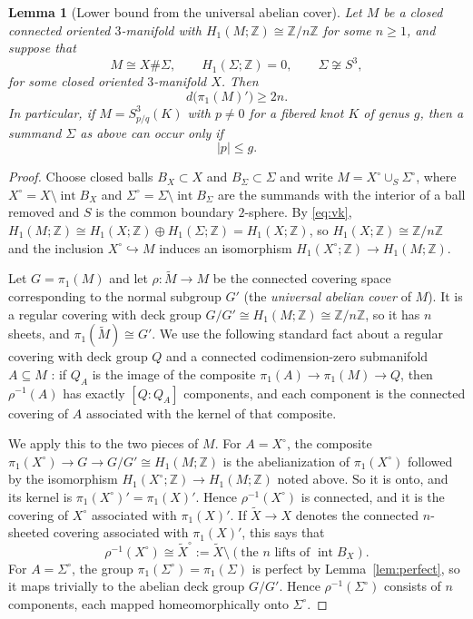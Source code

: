 \documentclass[12pt]{article}
\newcommand{\Z}{\mathbb Z}
\newcommand{\Surg}[2]{S^3_{#1}(#2)}
\newcommand{\Int}{\operatorname{int}}
\newcommand{\rk}{d}
\newtheorem{lemma}[theorem]{Lemma}
\theoremstyle{definition}
\theoremstyle{remark}
\begin{document}
\begin{lemma}[Lower bound from the universal abelian cover]\label{lem:cover}
Let \(M\) be a closed connected oriented \(3\)-manifold with
\(H_1(M;\Z)\cong\Z/n\Z\) for some \(n\geq1\), and suppose that
\[
 M\cong X\#\Sigma,
 \qquad H_1(\Sigma;\Z)=0,\qquad \Sigma\not\cong S^3,
\]
for some closed oriented \(3\)-manifold \(X\). Then
\[
 \rk\bigl(\pi_1(M)'\bigr)\geq 2n.
\]
In particular, if \(M=\Surg{p/q}{K}\) with \(p\neq0\) for a fibered knot
\(K\) of genus \(g\), then a summand \(\Sigma\) as above can occur only if
\begin{equation}\label{eq:numerator}
 |p|\leq g.
\end{equation}
\end{lemma}

\begin{proof}
Choose closed balls \(B_X\subset X\) and \(B_\Sigma\subset\Sigma\) and
write \(M=X^\circ\cup_S\Sigma^\circ\), where
\(X^\circ=X\setminus\Int B_X\) and \(\Sigma^\circ=\Sigma\setminus\Int B_\Sigma\)
are the summands with the interior of a ball removed and \(S\) is the
common boundary \(2\)-sphere. By \eqref{eq:vk},
\(H_1(M;\Z)\cong H_1(X;\Z)\oplus H_1(\Sigma;\Z)=H_1(X;\Z)\), so
\(H_1(X;\Z)\cong\Z/n\Z\) and the inclusion \(X^\circ\hookrightarrow M\)
induces an isomorphism \(H_1(X^\circ;\Z)\to H_1(M;\Z)\).

Let \(G=\pi_1(M)\) and let \(\rho\colon\widetilde M\to M\) be the
connected covering space corresponding to the normal subgroup \(G'\)
(the \emph{universal abelian cover} of \(M\)). It is a regular covering
with deck group \(G/G'\cong H_1(M;\Z)\cong\Z/n\Z\),
so it has \(n\) sheets, and \(\pi_1(\widetilde M)\cong G'\). We use the
following standard fact about a regular covering with deck group \(Q\)
and a connected codimension-zero submanifold \(A\subseteq M\)
\cite[\S1.3]{HatcherAT}: if \(Q_A\) is the image of the composite
\(\pi_1(A)\to\pi_1(M)\to Q\), then \(\rho^{-1}(A)\) has exactly
\([Q:Q_A]\) components, and each component is the connected covering of
\(A\) associated with the kernel of that composite.

We apply this to the two pieces of \(M\). For \(A=X^\circ\), the composite
\(\pi_1(X^\circ)\to G\to G/G'\cong H_1(M;\Z)\) is the abelianization of
\(\pi_1(X^\circ)\) followed by the isomorphism
\(H_1(X^\circ;\Z)\to H_1(M;\Z)\) noted above. So it is onto, and its kernel
is \(\pi_1(X^\circ)'=\pi_1(X)'\). Hence \(\rho^{-1}(X^\circ)\) is
connected, and it is the covering of \(X^\circ\) associated with
\(\pi_1(X)'\). If \(\widetilde X\to X\) denotes the connected
\(n\)-sheeted covering associated with \(\pi_1(X)'\), this says that
\[
 \rho^{-1}(X^\circ)\cong\widetilde X^\circ:=\widetilde X\setminus
 (\text{the \(n\) lifts of }\Int B_X).
\]
For \(A=\Sigma^\circ\), the group \(\pi_1(\Sigma^\circ)=\pi_1(\Sigma)\) is
perfect by Lemma~\ref{lem:perfect}, so it maps trivially to the abelian
deck group \(G/G'\). Hence \(\rho^{-1}(\Sigma^\circ)\) consists of \(n\)
components, each mapped homeomorphically onto \(\Sigma^\circ\).


\end{proof}
\end{document}
